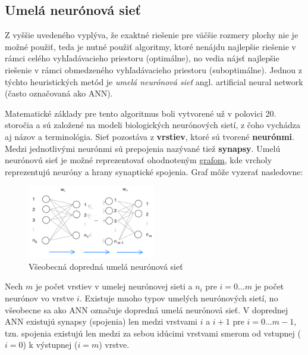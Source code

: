 \subsection{Umelá neurónová sieť}\label{subsec:algo-ann}

Z vyššie uvedeného vyplýva, že exaktné riešenie pre väčšie rozmery plochy nie je možné použiť, teda je nutné použiť
algoritmy, ktoré nenájdu najlepšie riešenie v rámci celého vyhľadávacieho priestoru (optimálne), no vedia nájsť
najlepšie riešenie v rámci obmedzeného vyhľadávacieho priestoru (suboptimálne).
Jednou z týchto heuristických metód je \emph{umelá neurónová sieť} angl. artificial neural network
(často označovaná ako ANN).

Matematické základy pre tento algoritmus boli vytvorené už v polovici 20. storočia a sú založené na modeli
biologických neurónových sietí, z čoho vychádza aj názov a terminológia.\cite{algo_ann_history}
Sieť pozostáva z \textbf{vrstiev}, ktoré sú tvorené \textbf{neurónmi}.
Medzi jednotlivými neurónmi sú prepojenia nazývané tiež \textbf{synapsy}.\cite{algo_ann_terminology}
Umelú neurónovú sieť je možné reprezentovať ohodnoteným \hyperref[figure:general-ann]{grafom}, kde vrcholy reprezentujú
neuróny a hrany synaptické spojenia.
Graf môže vyzerať nasledovne:
\begin{figure}[H]
    \centering
    \includegraphics[width=0.5\textwidth]{images/general-ann.jpg}
    \caption{Všeobecná dopredná umelá neurónová sieť}
\end{figure}\label{figure:general-ann}
Nech $m$ je počet vrstiev v umelej neurónovej sieti a $n_i$ pre $i = 0 \dots m$ je počet neurónov vo vrstve $i$.
Existuje mnoho typov umelých neurónových sietí, no všeobecne sa ako ANN označuje dopredná umelá neurónová sieť.
V doprednej ANN existujú synapsy (spojenia) len medzi vrstvami $i$ a $i + 1$ pre $i = 0 \dots m - 1$, tzn. spojenia
existujú len medzi za sebou idúcimi vrstvami smerom od vstupnej ($i=0$) k výstupnej ($i=m$) vrstve.

